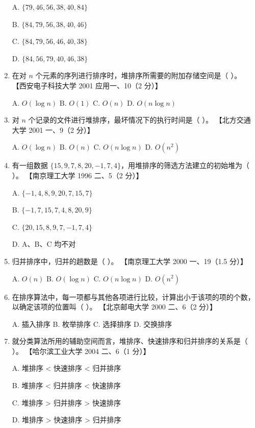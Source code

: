 \documentclass[lang=cn,newtx,10pt,scheme=chinese]{elegantbook}
\begin{document}
\begin{enumerate}
    A. $\{79, 46, 56, 38, 40, 84\}$  

    B. $\{84, 79, 56, 38, 40, 46\}$  

    C. $\{84, 79, 56, 46, 40, 38\}$  

    D. $\{84, 56, 79, 40, 46, 38\}$  

    \item 在对 $n$ 个元素的序列进行排序时，堆排序所需要的附加存储空间是（ ）。  
    【西安电子科技大学 2001 应用一、10（2 分）】  

    A. $O(\log n)$ \quad B. $O(1)$ \quad C. $O(n)$ \quad D. $O(n \log n)$  

    \item 对 $n$ 个记录的文件进行堆排序，最坏情况下的执行时间是（ ）。  
    【北方交通大学 2001 一、9（2 分）】  

    A. $O(\log n)$ \quad B. $O(n)$ \quad C. $O(n \log n)$ \quad D. $O(n^2)$  

    \item 有一组数据 $\{15, 9, 7, 8, 20, -1, 7, 4\}$，用堆排序的筛选方法建立的初始堆为（ ）。  
    【南京理工大学 1996 二、5（2 分）】  

    A. $\{-1, 4, 8, 9, 20, 7, 15, 7\}$  

    B. $\{-1, 7, 15, 7, 4, 8, 20, 9\}$  

    C. $\{20, 15, 8, 9, 7, -1, 7, 4\}$  

    D. A、B、C 均不对  

    \item 归并排序中，归并的趟数是（ ）。  
    【南京理工大学 2000 一、19（1.5 分）】  

    A. $O(n)$ \quad B. $O(\log n)$ \quad C. $O(n \log n)$ \quad D. $O(n^2)$  

    \item 在排序算法中，每一项都与其他各项进行比较，计算出小于该项的项的个数，以确定该项的位置叫（ ）。  
    【北京邮电大学 2000 二、6（2 分）】  

    A. 插入排序 \quad B. 枚举排序 \quad C. 选择排序 \quad D. 交换排序  

    \item 就分类算法所用的辅助空间而言，堆排序、快速排序和归并排序的关系是（ ）。  
    【哈尔滨工业大学 2004 二、6（1 分）】 

    A. 堆排序 < 快速排序 < 归并排序  

    B. 堆排序 < 归并排序 < 快速排序  

    C. 堆排序 > 归并排序 > 快速排序  

    D. 堆排序 > 快速排序 > 归并排序  


\end{enumerate}
\end{document}
